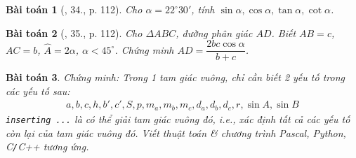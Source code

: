 \documentclass{article}
\newtheorem{baitoan}{Bài toán}
\begin{document}
\begin{baitoan}[\cite{Tuyen_Toan_9}, 34., p. 112]
	Cho $\alpha = 22^\circ30'$, tính $\sin\alpha,\cos\alpha,\tan\alpha,\cot\alpha$.
\end{baitoan}

\begin{baitoan}[\cite{Tuyen_Toan_9}, 35., p. 112]
	Cho $\Delta ABC$, đường phân giác $AD$. Biết $AB = c$, $AC = b$, $\widehat{A} = 2\alpha$, $\alpha < 45^\circ$. Chứng minh $AD = \dfrac{2bc\cos\alpha}{b + c}$.
\end{baitoan}

\begin{baitoan}
	Chứng minh: Trong 1 tam giác vuông, chỉ cần biết 2 yếu tố trong các yếu tố sau:
	\begin{align*}
		a,b,c,h,b',c',S,p,m_a,m_b,m_c,d_a,d_b,d_c,r,\sin A,\sin B
	\end{align*}
	\texttt{inserting ...} là có thể giải tam giác vuông đó, i.e., xác định tất cả các yếu tố còn lại của tam giác vuông đó. Viết thuật toán \& chương trình {\sf Pascal, Python, C\texttt{/}C++} tương ứng.
\end{baitoan}


\printbibliography[heading=bibintoc]
	
\end{document}
